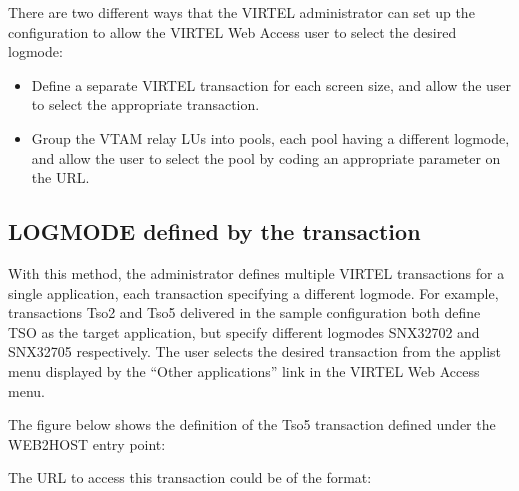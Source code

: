 \documentclass[letterpaper,10pt,english]{sphinxmanual}
\begin{document}
There are two different ways that the VIRTEL administrator can set up the configuration to allow the VIRTEL Web Access user to select the desired logmode:
\begin{itemize}
\item {} 
Define a separate VIRTEL transaction for each screen size, and allow the user to select the appropriate transaction.

\item {} 
Group the VTAM relay LUs into pools, each pool having a different logmode, and allow the user to select the pool by coding an appropriate parameter on the URL.

\end{itemize}

\ignorespaces 

\subsection{LOGMODE defined by the transaction}
\label{\detokenize{Customization:logmode-defined-by-the-transaction}}\label{\detokenize{Customization:index-66}}
With this method, the administrator defines multiple VIRTEL transactions for a single application, each transaction specifying a different logmode. For example, transactions Tso2 and Tso5 delivered in the sample configuration both define TSO as the target application, but specify different logmodes SNX32702 and SNX32705 respectively. The user selects the desired transaction from the applist menu displayed by the “Other applications” link in the VIRTEL Web Access menu.

The figure below shows the definition of the Tso5 transaction defined under the WEB2HOST entry point:



The URL to access this transaction could be of the format:

\begin{sphinxVerbatim}[commandchars=\\\{\}]
\end{sphinxVerbatim}
\end{document}
